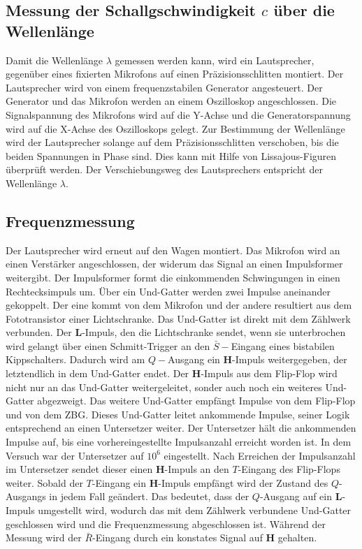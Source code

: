 \subsection{Messung der Schallgschwindigkeit $c$ über die Wellenlänge}
Damit die Wellenlänge $\lambda$ gemessen werden kann, wird ein Lautsprecher, gegenüber eines fixierten Mikrofons auf einen Präzisionsschlitten montiert. Der Lautsprecher wird von einem frequenzstabilen Generator angesteuert. Der Generator und das Mikrofon werden an einem Oszilloskop angeschlossen. Die Signalspannung des Mikrofons wird auf die Y-Achse und die Generatorspannung wird auf die X-Achse des Oszilloskops gelegt. Zur Bestimmung der Wellenlänge wird der Lautsprecher solange auf dem Präzisionsschlitten verschoben, bis die beiden Spannungen in Phase sind. Dies kann mit Hilfe von Lissajous-Figuren überprüft werden. Der Verschiebungsweg des Lautsprechers entspricht der Wellenlänge $\lambda$.
\subsection{Frequenzmessung}
Der Lautsprecher wird erneut auf den Wagen montiert. Das Mikrofon wird an einen Verstärker angeschlossen, der widerum das Signal an einen Impulsformer weitergibt. Der Impulsformer formt die einkommenden Schwingungen in einen Rechtecksimpuls um. Über ein Und-Gatter werden zwei Impulse aneinander gekoppelt. Der eine kommt von dem Mikrofon und der andere resultiert aus dem Fototransistor einer Lichtschranke. Das Und-Gatter ist direkt mit dem Zählwerk verbunden. Der \textbf{L}-Impuls, den die Lichtschranke sendet, wenn sie unterbrochen wird gelangt über einen Schmitt-Trigger an den $\bar{S}-$Eingang eines bistabilen Kippschalters. Dadurch wird am $Q-$Ausgang ein \textbf{H}-Impuls weitergegeben, der letztendlich in dem Und-Gatter endet. Der \textbf{H}-Impuls aus dem Flip-Flop wird nicht nur an das Und-Gatter weitergeleitet, sonder auch noch ein weiteres Und-Gatter abgezweigt. Das weitere Und-Gatter empfängt Impulse von dem Flip-Flop und von dem ZBG. Dieses Und-Gatter leitet ankommende Impulse, seiner Logik entsprechend an einen Untersetzer weiter. Der Untersetzer hält die ankommenden Impulse auf, bis eine vorhereingestellte Impulsanzahl erreicht worden ist. In dem Versuch war der Untersetzer auf $10^6$ eingestellt. Nach Erreichen der Impulsanzahl im Untersetzer sendet dieser einen \textbf{H}-Impuls an den $T$-Eingang des Flip-Flops weiter. Sobald der $T$-Eingang ein \textbf{H}-Impuls empfängt wird der Zustand des $Q$-Ausgangs in jedem Fall geändert. Das bedeutet, dass der $Q$-Ausgang auf ein \textbf{L}-Impuls umgestellt wird, wodurch das mit dem Zählwerk verbundene Und-Gatter geschlossen wird und die Frequenzmessung abgeschlossen ist. Während der Messung wird der $\bar{R}$-Eingang durch ein konstates Signal auf \textbf{H} gehalten.
